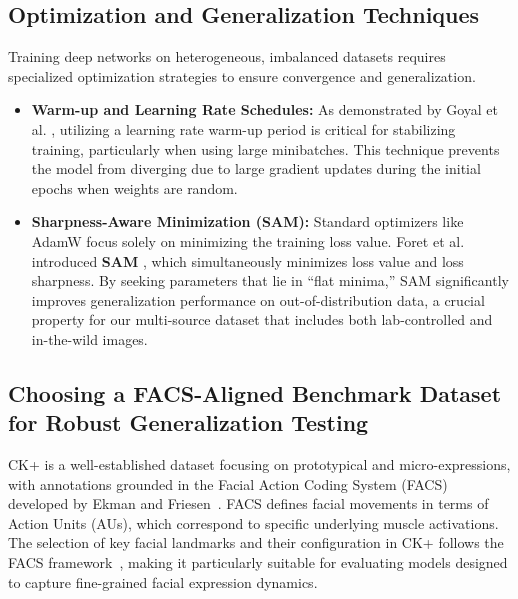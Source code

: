\subsection{Optimization and Generalization Techniques}
Training deep networks on heterogeneous, imbalanced datasets requires specialized optimization strategies to ensure convergence and generalization. 
\begin{itemize}
    \item \textbf{Warm-up and Learning Rate Schedules:} As demonstrated by Goyal et al. \cite{goyal2018accuratelargeminibatchsgd}, utilizing a learning rate warm-up period is critical for stabilizing training, particularly when using large minibatches. This technique prevents the model from diverging due to large gradient updates during the initial epochs when weights are random.
    \item \textbf{Sharpness-Aware Minimization (SAM):} Standard optimizers like AdamW focus solely on minimizing the training loss value. Foret et al. introduced \textbf{SAM} \cite{foret2021sharpnessawareminimizationefficientlyimproving}, which simultaneously minimizes loss value and loss sharpness. By seeking parameters that lie in ``flat minima,'' SAM significantly improves generalization performance on out-of-distribution data, a crucial property for our multi-source dataset that includes both lab-controlled and in-the-wild images.
\end{itemize}

\subsection{Choosing a FACS-Aligned Benchmark Dataset for Robust Generalization Testing}

CK+ is a well-established dataset focusing on prototypical and micro-expressions, with annotations grounded in the Facial Action Coding System (FACS) developed by Ekman and Friesen~\cite{Ekman1978FACS}. FACS defines facial movements in terms of Action Units (AUs), which correspond to specific underlying muscle activations. The selection of key facial landmarks and their configuration in CK+ follows the FACS framework~\cite{Lucey2010CK}, making it particularly suitable for evaluating models designed to capture fine-grained facial expression dynamics.

